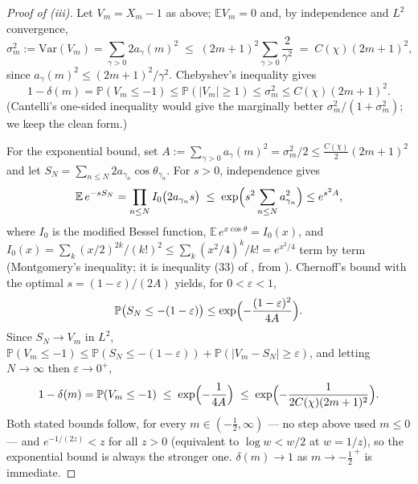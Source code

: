 \documentclass[11pt]{article}
\begin{document}
\begin{proof}[Proof of (iii)]
Let $V_m=X_m-1$ as above; $\mathbb EV_m=0$ and, by independence and
$L^2$ convergence,
\[
\sigma_m^2:=\mathrm{Var}(V_m)=\sum_{\gamma>0}2a_\gamma(m)^2
\;\le\;(2m+1)^2\sum_{\gamma>0}\frac{2}{\gamma^2}\;=\;C(\chi)(2m+1)^2 ,
\]
since $a_\gamma(m)^2\le(2m+1)^2/\gamma^2$. Chebyshev's inequality
gives
\[
1-\delta(m)=\mathbb P(V_m\le-1)\le\mathbb P(|V_m|\ge1)\le\sigma_m^2
\le C(\chi)(2m+1)^2 .
\]
(Cantelli's one-sided inequality would give the marginally better
$\sigma_m^2/(1+\sigma_m^2)$; we keep the clean form.)

For the exponential bound, set $A:=\sum_{\gamma>0}a_\gamma(m)^2
=\sigma_m^2/2\le\tfrac{C(\chi)}{2}(2m+1)^2$ and let
$S_N=\sum_{n\le N}2a_{\gamma_n}\cos\theta_{\gamma_n}$. For $s>0$,
independence gives
\[
\mathbb E\,e^{-sS_N}=\prod_{n\le N}I_0\bigl(2a_{\gamma_n}s\bigr)
\;\le\;\exp\Bigl(s^2\sum_{n\le N}a_{\gamma_n}^2\Bigr)\le e^{s^2A},
\]
where $I_0$ is the modified Bessel function,
$\mathbb E\,e^{x\cos\theta}=I_0(x)$, and
$I_0(x)=\sum_k(x/2)^{2k}/(k!)^2\le\sum_k(x^2/4)^k/k!=e^{x^2/4}$
term by term (Montgomery's inequality; it is inequality (33) of
\cite{Hum13}, from \cite[\S3, eq.~(2)]{Mon80}). Chernoff's bound with
the optimal $s=(1-\varepsilon)/(2A)$ yields, for
$0<\varepsilon<1$,
\[
\mathbb P\bigl(S_N\le-(1-\varepsilon)\bigr)
\le\exp\Bigl(-\frac{(1-\varepsilon)^2}{4A}\Bigr).
\]
Since $S_N\to V_m$ in $L^2$,
$\mathbb P(V_m\le-1)\le\mathbb P(S_N\le-(1-\varepsilon))
+\mathbb P(|V_m-S_N|\ge\varepsilon)$, and letting $N\to\infty$ then
$\varepsilon\to0^+$,
\[
1-\delta(m)=\mathbb P(V_m\le-1)\;\le\;\exp\Bigl(-\frac1{4A}\Bigr)
\;\le\;\exp\Bigl(-\frac{1}{2C(\chi)(2m+1)^2}\Bigr).
\]
Both stated bounds follow, for every $m\in(-\tfrac12,\infty)$ --- no
step above used $m\le0$ --- and $e^{-1/(2z)}<z$ for all $z>0$
(equivalent to $\log w<w/2$ at $w=1/z$), so the exponential bound is
always the stronger one. $\delta(m)\to1$ as $m\to-\tfrac12^{\,+}$ is
immediate.


\end{proof}
\end{document}
